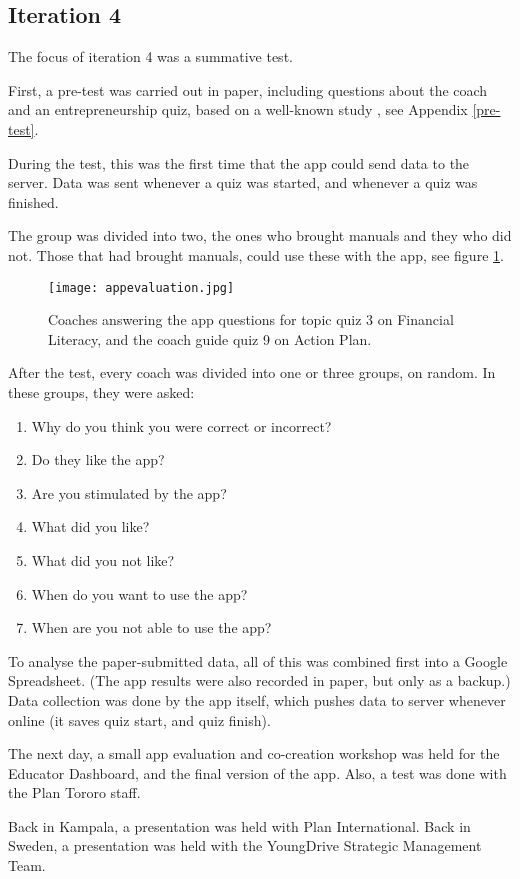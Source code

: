 \subsection{Iteration 4}

The focus of iteration 4 was a summative test.

First, a pre-test was carried out in paper, including questions about the coach and an entrepreneurship quiz, based on a well-known study \citep{general-entrepreneurship-quiz}, see Appendix \ref{pre-test}.

During the test, this was the first time that the app could send data to the server. Data was sent whenever a quiz was started, and whenever a quiz was finished.

The group was divided into two, the ones who brought manuals and they who did not. Those that had brought manuals, could use these with the app, see figure \ref{fig:appevaluation}.

\begin{figure}[h]
    \centering
    \texttt{[image: appevaluation.jpg]}
    \caption{Coaches answering the app questions for topic quiz 3 on Financial Literacy, and the coach guide quiz 9 on Action Plan.}
    \label{fig:appevaluation}
\end{figure}

After the test, every coach was divided into one or three groups, on random. In these groups, they were asked:

\begin{enumerate}
\item Why do you think you were correct or incorrect?
\item Do they like the app?
\item Are you stimulated by the app?
\item What did you like?
\item What did you not like?
\item When do you want to use the app?
\item When are you not able to use the app?
\end{enumerate}

To analyse the paper-submitted data, all of this was combined first into a Google Spreadsheet. (The app results were also recorded in paper, but only as a backup.) Data collection was done by the app itself, which pushes data to server whenever online (it saves quiz start, and quiz finish).

The next day, a small app evaluation and co-creation workshop was held for the Educator Dashboard, and the final version of the app. Also, a test was done with the Plan Tororo staff.

Back in Kampala, a presentation was held with Plan International. Back in Sweden, a presentation was held with the YoungDrive Strategic Management Team.

